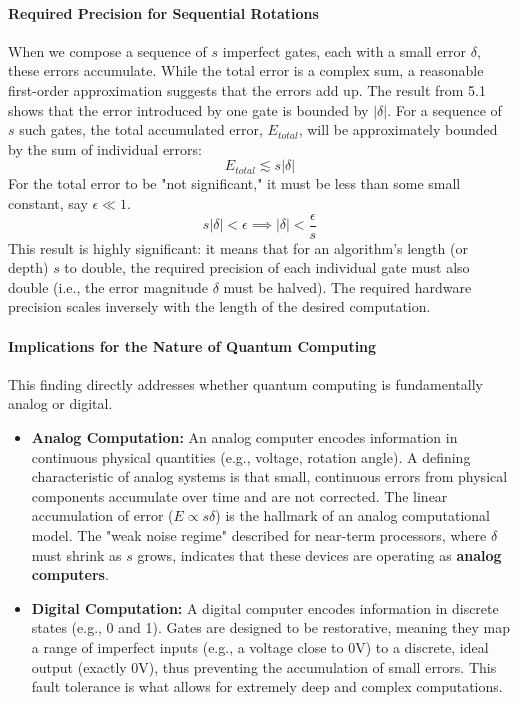 \documentclass{article}
\begin{document}
\paragraph{Required Precision for Sequential Rotations}
When we compose a sequence of $s$ imperfect gates, each with a small error $\delta$, these errors accumulate. While the total error is a complex sum, a reasonable first-order approximation suggests that the errors add up. The result from 5.1 shows that the error introduced by one gate is bounded by $|\delta|$. For a sequence of $s$ such gates, the total accumulated error, $E_{total}$, will be approximately bounded by the sum of individual errors:
\[ E_{total} \lesssim s|\delta| \]
For the total error to be "not significant," it must be less than some small constant, say $\epsilon \ll 1$.
\[ s|\delta| < \epsilon \implies |\delta| < \frac{\epsilon}{s} \]
This result is highly significant: it means that for an algorithm's length (or depth) $s$ to double, the required precision of each individual gate must also double (i.e., the error magnitude $\delta$ must be halved). The required hardware precision scales inversely with the length of the desired computation.

\paragraph{Implications for the Nature of Quantum Computing}
This finding directly addresses whether quantum computing is fundamentally analog or digital.

\begin{itemize}
    \item \textbf{Analog Computation:} An analog computer encodes information in continuous physical quantities (e.g., voltage, rotation angle). A defining characteristic of analog systems is that small, continuous errors from physical components accumulate over time and are not corrected. The linear accumulation of error ($E \propto s\delta$) is the hallmark of an analog computational model. The "weak noise regime" described for near-term processors, where $\delta$ must shrink as $s$ grows, indicates that these devices are operating as \textbf{analog computers}.

    \item \textbf{Digital Computation:} A digital computer encodes information in discrete states (e.g., 0 and 1). Gates are designed to be restorative, meaning they map a range of imperfect inputs (e.g., a voltage close to 0V) to a discrete, ideal output (exactly 0V), thus preventing the accumulation of small errors. This fault tolerance is what allows for extremely deep and complex computations.
\end{itemize}
\end{document}
